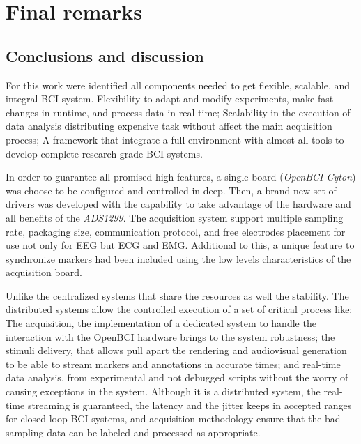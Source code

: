 \chapter{Final remarks}\label{ch:chapter_5}

\section{Conclusions and discussion}

For this work were identified all components needed to get flexible, scalable, and integral  BCI system. Flexibility to adapt and modify experiments, make fast changes in runtime, and process data in real-time; Scalability in the execution of data analysis distributing expensive task without affect the main acquisition process; A framework that integrate a full environment with almost all tools to develop complete research-grade BCI systems.

In order to guarantee all promised high features, a single board (\textit{OpenBCI Cyton}) was choose to be configured and controlled in deep. Then, a brand new set of drivers was developed with the capability to take advantage of the hardware and all benefits of the \textit{ADS1299}. The acquisition system support multiple sampling rate, packaging size, communication protocol, and free electrodes placement for use not only for \gls*{EEG} but \gls*{ECG} and \gls*{EMG}. Additional to this, a unique feature to synchronize markers had been included using the low levels characteristics of the acquisition board.

Unlike the centralized systems that share the resources as well the stability. The distributed systems allow the controlled execution of a set of critical process like: The acquisition, the implementation of a dedicated system to handle the interaction with the OpenBCI hardware brings to the system robustness; the stimuli delivery, that allows pull apart the rendering and audiovisual generation to be able to stream markers and annotations in accurate times; and real-time data analysis, from experimental and not debugged scripts without the worry of causing exceptions in the system. Although it is a distributed system, the real-time streaming is guaranteed, the latency and the jitter keeps in accepted ranges for closed-loop \gls{BCI} systems, and acquisition methodology ensure that the bad sampling data can be labeled and processed as appropriate. 

